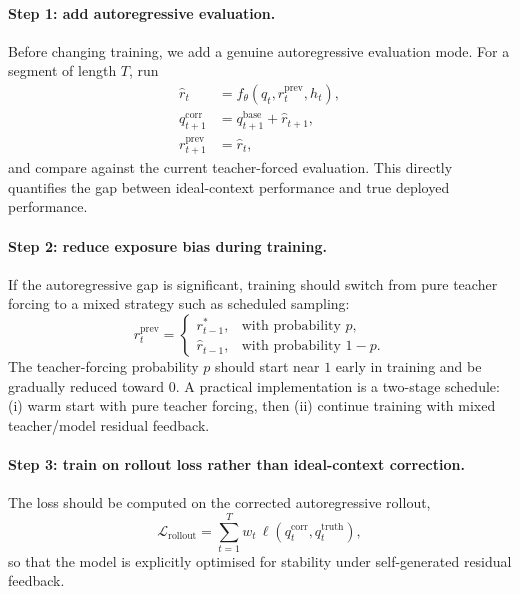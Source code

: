 \documentclass[11pt,a4paper]{article}
\begin{document}
\paragraph{Step 1: add autoregressive evaluation.}
Before changing training, we add a genuine autoregressive evaluation mode. For a segment of length $T$, run
\begin{align}
\hat r_t &= f_\theta(q_t, r^{\mathrm{prev}}_t, h_t),\\
q^{\mathrm{corr}}_{t+1} &= q^{\mathrm{base}}_{t+1} + \hat r_{t+1},\\
r^{\mathrm{prev}}_{t+1} &= \hat r_t,
\end{align}
and compare against the current teacher-forced evaluation. This directly quantifies the gap between ideal-context performance and true deployed performance.

\paragraph{Step 2: reduce exposure bias during training.}
If the autoregressive gap is significant, training should switch from pure teacher forcing to a mixed strategy such as scheduled sampling:
\begin{equation}
r^{\mathrm{prev}}_t =
\begin{cases}
r^*_{t-1}, & \text{with probability } p,\\
\hat r_{t-1}, & \text{with probability } 1-p.
\end{cases}
\end{equation}
The teacher-forcing probability $p$ should start near $1$ early in training and be gradually reduced toward $0$. A practical implementation is a two-stage schedule: (i) warm start with pure teacher forcing, then (ii) continue training with mixed teacher/model residual feedback.

\paragraph{Step 3: train on rollout loss rather than ideal-context correction.}
The loss should be computed on the corrected autoregressive rollout,
\begin{equation}
\mathcal{L}_{\mathrm{rollout}}
=
\sum_{t=1}^{T} w_t\,
\ell\!\left(q^{\mathrm{corr}}_t, q^{\mathrm{truth}}_t\right),
\end{equation}
so that the model is explicitly optimised for stability under self-generated residual feedback.
\end{document}
